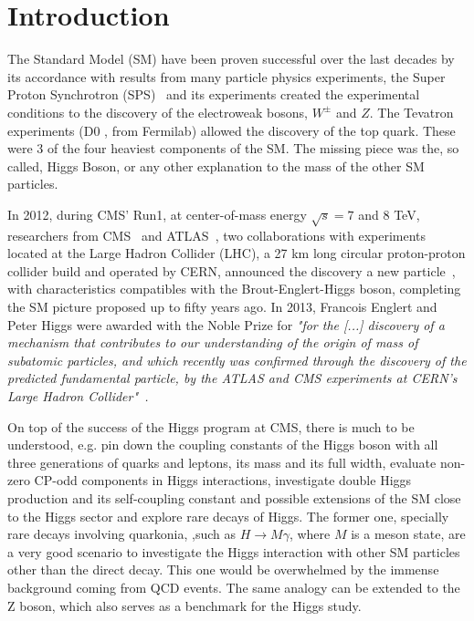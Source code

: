 \chapter{Introduction}

The Standard Model (SM) have been proven successful over the last decades by its accordance with results from many particle physics experiments, the Super Proton Synchrotron (SPS)~\cite{Synchrotron:1997188} and its experiments created the experimental conditions to the discovery of the electroweak bosons, $W^{\pm}$ and $Z$. The Tevatron experiments (D0 , from Fermilab) allowed the discovery of the top quark. These were 3 of the four heaviest components of the SM. The missing piece was the, so called, Higgs Boson, or any other explanation to the mass of the other SM particles. 

In 2012, during CMS' Run1, at center-of-mass energy $\sqrt{s} = 7$ and $8$ TeV, researchers from CMS~\cite{Chatrchyan:2008zzk} and ATLAS~\cite{atlas_collaboration_2008}, two collaborations with experiments located at the Large Hadron Collider (LHC), a 27 km long circular proton-proton collider build and operated by CERN, announced the discovery a new particle~\cite{higgs_discovery_cms, higgs_discovery_atlas}, with characteristics compatibles with the Brout-Englert-Higgs boson, completing the SM picture proposed up to fifty years ago. In 2013, Francois Englert and Peter Higgs were awarded with the Noble Prize for \textit{"for the [...] discovery of a mechanism that contributes to our understanding of the origin of mass of subatomic particles, and which recently was confirmed through the discovery of the predicted fundamental particle, by the ATLAS and CMS experiments at CERN's Large Hadron Collider"~\cite{noble_prize}.}

On top of the success of the Higgs program at CMS, there is much to be understood, e.g. pin down the coupling constants of the Higgs boson with all three generations of quarks and leptons, its mass and its full width, evaluate non-zero CP-odd components in Higgs interactions, investigate double Higgs production and its self-coupling constant and possible extensions of the SM close to the Higgs sector and explore rare decays of Higgs. The former one, specially rare decays involving quarkonia, ,such as $H \rightarrow M \gamma$, where $M$ is a meson state, are a very good scenario to investigate the Higgs interaction with other SM particles other than the direct decay. This one would be overwhelmed by the immense background coming from QCD events. The same analogy can be extended to the Z boson, which also serves as a benchmark for the Higgs study.

